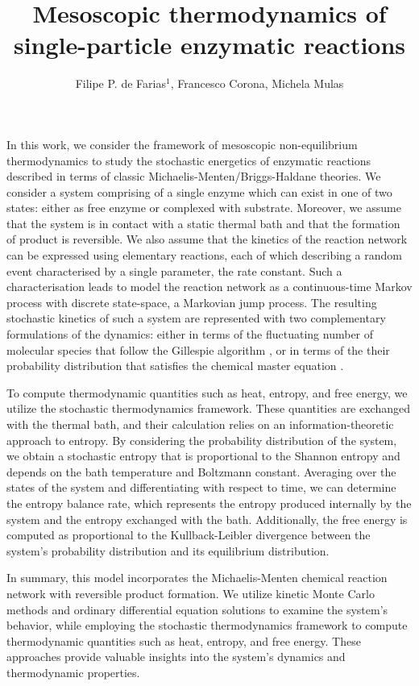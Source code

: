 \documentclass[11pt]{amsart}
\title{Mesoscopic thermodynamics of single-particle enzymatic reactions}
\author{Filipe P. de Farias$^{1}$, Francesco Corona, Michela Mulas}
\begin{document}
\maketitle



In this work, we consider the framework of mesoscopic non-equilibrium thermodynamics \cite{PRIGOGINE1953241,MAZUR1998451,doi:10.1021/jp052904i} to study the stochastic energetics of enzymatic reactions described in terms of classic Michaelis-Menten/Briggs-Haldane theories. We consider a system comprising of a single enzyme which can exist in one of two states: either as free enzyme or complexed with substrate. Moreover, we assume that the system is in contact with a static thermal bath and that the formation of product is reversible. We also assume that the kinetics of the reaction network can be expressed using elementary reactions, each of which describing a random event characterised by a single parameter, the rate constant. Such a characterisation leads to model the reaction network as a continuous-time Markov process with discrete state-space, a Markovian jump process. The resulting stochastic kinetics of such a system are represented with two complementary formulations of the dynamics: either in terms of the fluctuating number of molecular species that follow the Gillespie algorithm \cite{GILLESPIE1976403}, or in terms of the their probability distribution that satisfies the chemical master equation \cite{GILLESPIE1992404}.

{\color{red}To compute thermodynamic quantities such as heat, entropy, and free energy, we utilize the stochastic thermodynamics framework. These quantities are exchanged with the thermal bath, and their calculation relies on an information-theoretic approach to entropy. By considering the probability distribution of the system, we obtain a stochastic entropy that is proportional to the Shannon entropy and depends on the bath temperature and Boltzmann constant. Averaging over the states of the system and differentiating with respect to time, we can determine the entropy balance rate, which represents the entropy produced internally by the system and the entropy exchanged with the bath. Additionally, the free energy is computed as proportional to the Kullback-Leibler divergence between the system's probability distribution and its equilibrium distribution.

In summary, this model incorporates the Michaelis-Menten chemical reaction network with reversible product formation. We utilize kinetic Monte Carlo methods and ordinary differential equation solutions to examine the system's behavior, while employing the stochastic thermodynamics framework to compute thermodynamic quantities such as heat, entropy, and free energy. These approaches provide valuable insights into the system's dynamics and thermodynamic properties.}

\nocite{*}

\footnotesize{}
\end{document}
